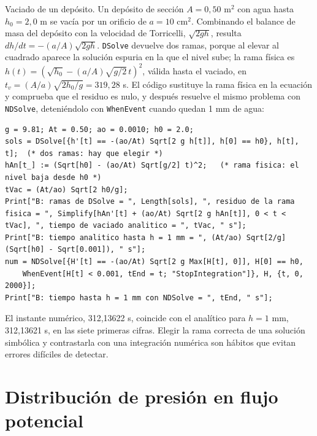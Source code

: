 \documentclass[10pt,openany]{book}
\begin{document}
Vaciado de un depósito. Un depósito de sección \(A = 0{,}50\) m\(^2\) con agua hasta \(h_0 = 2{,}0\) m se vacía por un orificio de \(a = 10\) cm\(^2\). Combinando el balance de masa del depósito con la velocidad de Torricelli, \(\sqrt{2gh}\), resulta \(dh/dt = -(a/A)\sqrt{2gh}\). \texttt{DSolve} devuelve dos ramas, porque al elevar al cuadrado aparece la solución espuria en la que el nivel sube; la rama física es \(h(t) = (\sqrt{h_0} - (a/A)\sqrt{g/2}\,t)^{2}\), válida hasta el vaciado, en \(t_v = (A/a)\sqrt{2h_0/g} = 319{,}28\) s. El código sustituye la rama física en la ecuación y comprueba que el residuo es nulo, y después resuelve el mismo problema con \texttt{NDSolve}, deteniéndolo con \texttt{WhenEvent} cuando quedan 1 mm de agua:
\begin{lstlisting}[style=studium]
g = 9.81; At = 0.50; ao = 0.0010; h0 = 2.0;
sols = DSolve[{h'[t] == -(ao/At) Sqrt[2 g h[t]], h[0] == h0}, h[t], t];  (* dos ramas: hay que elegir *)
hAn[t_] := (Sqrt[h0] - (ao/At) Sqrt[g/2] t)^2;   (* rama fisica: el nivel baja desde h0 *)
tVac = (At/ao) Sqrt[2 h0/g];
Print["B: ramas de DSolve = ", Length[sols], ", residuo de la rama fisica = ", Simplify[hAn'[t] + (ao/At) Sqrt[2 g hAn[t]], 0 < t < tVac], ", tiempo de vaciado analitico = ", tVac, " s"];
Print["B: tiempo analitico hasta h = 1 mm = ", (At/ao) Sqrt[2/g] (Sqrt[h0] - Sqrt[0.001]), " s"];
num = NDSolve[{H'[t] == -(ao/At) Sqrt[2 g Max[H[t], 0]], H[0] == h0,
    WhenEvent[H[t] < 0.001, tEnd = t; "StopIntegration"]}, H, {t, 0, 2000}];
Print["B: tiempo hasta h = 1 mm con NDSolve = ", tEnd, " s"];
\end{lstlisting}
El instante numérico, 312,13622 s, coincide con el analítico para \(h = 1\) mm, 312,13621 s, en las siete primeras cifras. Elegir la rama correcta de una solución simbólica y contrastarla con una integración numérica son hábitos que evitan errores difíciles de detectar.

\section{Distribución de presión en flujo potencial}
\end{document}
